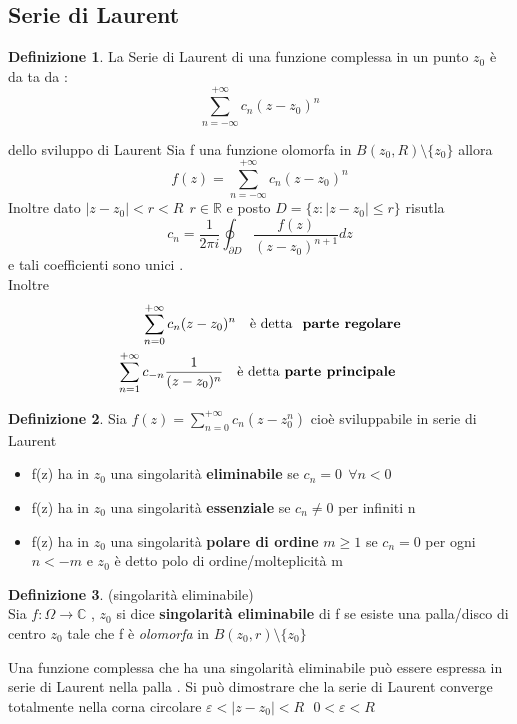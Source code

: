 \documentclass{article}
\theoremstyle{definition}
\newtheorem*{definizione}{Definizione}
\newcommand{\R}{\mathbb{R}}
\newcommand{\C}{\mathbb{C}}
\newcommand{\norm}[1]{|#1|}
\begin{document}
 				\subsection{Serie di Laurent}
 				\begin{definizione}
 					La Serie di Laurent di una funzione complessa in un punto $z_0$ è da ta da : 
 					$$\sum_{n=-\infty}^{+\infty}c_n(z-z_0)^n$$
 				\end{definizione}
 				\begin{teo}{dello sviluppo di Laurent}{}
Sia f una funzione olomorfa in $B(z_0,R) \setminus \{z_0\}$ allora 
$$f(z)=\sum_{n=-\infty}^{+\infty}c_n(z-z_0)^n$$  Inoltre dato $\norm{z-z_0}<r<R \ \ r \in \R$ e posto $D=\{z : \norm{z-z_0}\leq r\}$ risutla $$c_n=\frac{1}{2\pi i}\oint_{\partial D}\frac{f(z)}{(z-z_0)^{n+1}}dz$$ e tali coefficienti sono unici	.\\ 
Inoltre 
\begin{align*}
	\sum_{n=0}^{+\infty}c_n(z-z_0)^n \ \ \ \text{è detta \textbf{ parte regolare}} \\
	\sum_{n=1}^{+\infty} c_{-n}\frac{1}{(z-z_0)^n} \ \ \ \text{è detta \textbf{parte principale }}
	\end{align*}	\end{teo}
\begin{definizione}
	Sia $f(z)=\sum_{n=0}^{+\infty}c_n (z-z_0^n)$  cioè sviluppabile in serie di Laurent
	\begin{itemize}
		\item f(z) ha in $z_0$ una singolarità \textbf{eliminabile} se $c_n=0 \ \ \forall n <0$
		\item f(z) ha in $z_0$ una singolarità \textbf{essenziale} se $c_n\neq 0$ per infiniti n 
		\item f(z) ha in $z_0$ una singolarità \textbf{polare di ordine} $m\geq 1$ se $c_n=0$ per ogni $n <-m$ e $z_0$ è detto polo di ordine/molteplicità m
	\end{itemize}
\end{definizione} 
\begin{definizione}(singolarità eliminabile)\\
Sia $f: \Omega \rightarrow \C$ , $z_0$ si dice \textbf{singolarità eliminabile} di f se esiste una palla/disco di centro $z_0$ tale che f è \textit{olomorfa} in $B(z_0,r) \setminus \{z_0\}$ 
\end{definizione}
Una funzione complessa che ha una singolarità eliminabile può essere espressa in serie di Laurent nella palla . Si può dimostrare che la serie di Laurent converge totalmente nella corna circolare  $\varepsilon < |z-z_0|<R \ \ \ 0 < \varepsilon < R$
\end{document}
